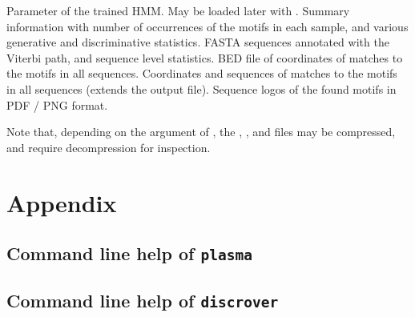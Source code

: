 \documentclass[a4paper]{article}
\newcommand{\plasma}[0]{\texttt{plasma}}
\newcommand{\discrover}[0]{\texttt{discrover}}
\begin{document}
\begin{description}
    Parameter of the trained HMM\@.
    May be loaded later with .
    Summary information with number of occurrences of the motifs in each sample, and various generative and discriminative statistics.
    FASTA sequences annotated with the Viterbi path, and sequence level statistics.
    BED file of coordinates of matches to the motifs in all sequences.
    Coordinates and sequences of matches to the motifs in all sequences (extends the  output file).
    Sequence logos of the found motifs in PDF / PNG format.
\end{description}

Note that, depending on the argument of , the , , and  files may be compressed, and require decompression for inspection.


\section{Appendix}
\subsection{Command line help of \plasma{}}
\label{appendix:plasma-cli-help}
{%
  \footnotesize
  
}

\subsection{Command line help of \discrover{}}
\label{appendix:discrover-cli-help}
{%
  \footnotesize
  
}



\nocite{*}
{}


\end{document}
